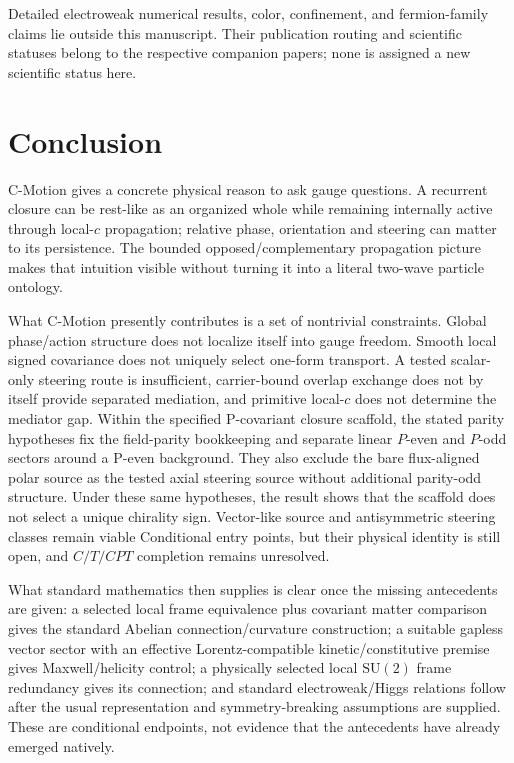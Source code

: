 \documentclass[11pt]{article}
\theoremstyle{definition}
\newcommand{\SUtwo}{\mathrm{SU}(2)}
\begin{document}
Detailed electroweak numerical results, color, confinement, and fermion-family
claims lie outside this manuscript.  Their publication routing and scientific
statuses belong to the respective companion papers; none is assigned a new
scientific status here.

\section{Conclusion}
\label{sec:conclusion}

C-Motion gives a concrete physical reason to ask gauge questions.  A recurrent closure can be rest-like as an organized whole while remaining internally active through local-$c$ propagation; relative phase, orientation and steering can matter to its persistence.  The bounded opposed/complementary propagation picture makes that intuition visible without turning it into a literal two-wave particle ontology.

What C-Motion presently contributes is a set of nontrivial constraints.  Global phase/action structure does not localize itself into gauge freedom.  Smooth local signed covariance does not uniquely select one-form transport.  A tested scalar-only steering route is insufficient, carrier-bound overlap exchange does not by itself provide separated mediation, and primitive local-$c$ does not determine the mediator gap.  Within the specified P-covariant closure scaffold, the stated parity
hypotheses fix the field-parity bookkeeping and separate linear
$P$-even and $P$-odd sectors around a P-even background.  They also
exclude the bare flux-aligned polar source as the tested axial steering
source without additional parity-odd structure.  Under these same
hypotheses, the result shows that the scaffold does not select a unique
chirality sign.  Vector-like source and antisymmetric steering classes remain viable Conditional entry points, but their physical identity is still open, and $C/T/CPT$ completion remains unresolved.

What standard mathematics then supplies is clear once the missing antecedents are given: a selected local frame equivalence plus covariant matter comparison gives the standard Abelian connection/curvature construction; a suitable gapless vector sector with an effective Lorentz-compatible kinetic/constitutive premise gives Maxwell/helicity control; a physically selected local $\SUtwo$ frame redundancy gives its connection; and standard electroweak/Higgs relations follow after the usual representation and symmetry-breaking assumptions are supplied.  These are conditional endpoints, not evidence that the antecedents have already emerged natively.
\end{document}
